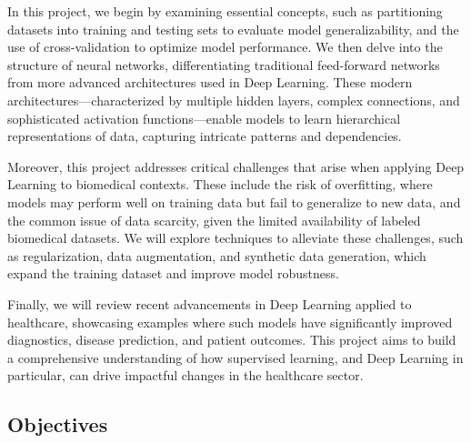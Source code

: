 \documentclass{article}
\begin{document}
In this project, we begin by examining essential concepts, such as partitioning datasets into training and testing sets to evaluate model generalizability, and the use of cross-validation to optimize model performance. We then delve into the structure of neural networks, differentiating traditional feed-forward networks from more advanced architectures used in Deep Learning. These modern architectures—characterized by multiple hidden layers, complex connections, and sophisticated activation functions—enable models to learn hierarchical representations of data, capturing intricate patterns and dependencies.

Moreover, this project addresses critical challenges that arise when applying Deep Learning to biomedical contexts. These include the risk of overfitting, where models may perform well on training data but fail to generalize to new data, and the common issue of data scarcity, given the limited availability of labeled biomedical datasets. We will explore techniques to alleviate these challenges, such as regularization, data augmentation, and synthetic data generation, which expand the training dataset and improve model robustness.

Finally, we will review recent advancements in Deep Learning applied to healthcare, showcasing examples where such models have significantly improved diagnostics, disease prediction, and patient outcomes. This project aims to build a comprehensive understanding of how supervised learning, and Deep Learning in particular, can drive impactful changes in the healthcare sector.

\subsection{Objectives}
\end{document}
